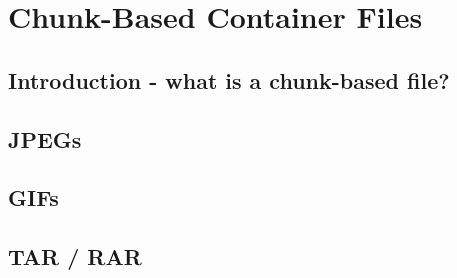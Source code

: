 \chapter{Chunk-Based Container Files}
\section{Introduction - what is a chunk-based file?}
\section{JPEGs}
\section{GIFs}
\section{TAR / RAR}
